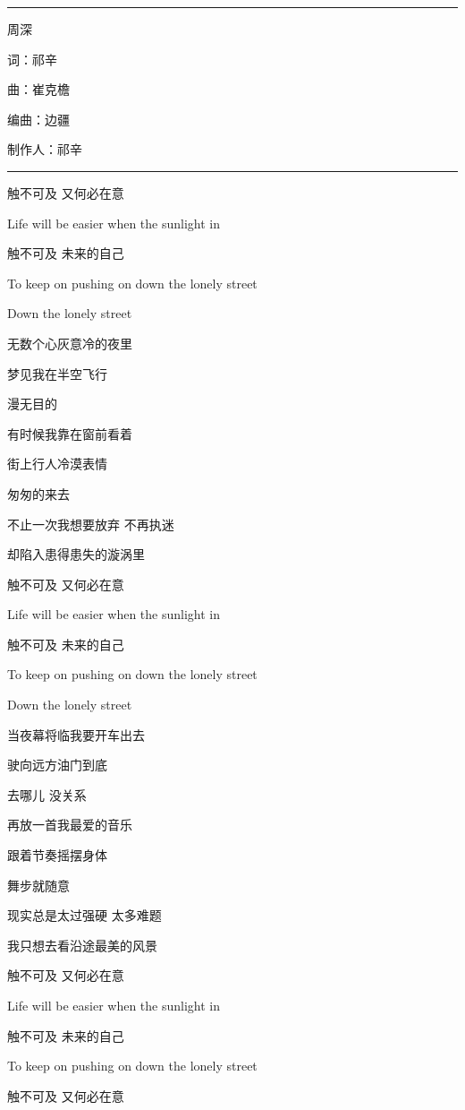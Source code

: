 \documentclass[]{ctexbook}
\begin{document}
\begin{center}\rule{0.5\linewidth}{0.5pt}\end{center}

周深

词：祁辛

曲：崔克檐

编曲：边疆

制作人：祁辛

\begin{center}\rule{0.5\linewidth}{0.5pt}\end{center}

触不可及 又何必在意

Life will be easier when the sunlight in

触不可及 未来的自己

To keep on pushing on down the lonely street

Down the lonely street

无数个心灰意冷的夜里

梦见我在半空飞行

漫无目的

有时候我靠在窗前看着

街上行人冷漠表情

匆匆的来去

不止一次我想要放弃 不再执迷

却陷入患得患失的漩涡里

触不可及 又何必在意

Life will be easier when the sunlight in

触不可及 未来的自己

To keep on pushing on down the lonely street

Down the lonely street

当夜幕将临我要开车出去

驶向远方油门到底

去哪儿 没关系

再放一首我最爱的音乐

跟着节奏摇摆身体

舞步就随意

现实总是太过强硬 太多难题

我只想去看沿途最美的风景

触不可及 又何必在意

Life will be easier when the sunlight in

触不可及 未来的自己

To keep on pushing on down the lonely street

触不可及 又何必在意
\end{document}
